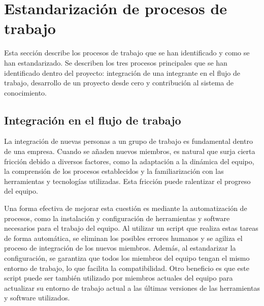 \section{Estandarización de procesos de trabajo}
Esta sección describe los procesos de trabajo que se
han identificado y como se han estandarizado. Se describen
los tres procesos principales que se han identificado dentro
del proyecto: integración de una integrante en el flujo de trabajo,
desarrollo de un proyecto desde cero y contribución al sistema
de conocimiento.

\subsection{Integración en el flujo de trabajo}
La integración de nuevas personas a un grupo de trabajo es fundamental
dentro de una empresa. Cuando se añaden nuevos miembros, es natural que 
surja cierta fricción debido a diversos factores, como la adaptación a 
la dinámica del equipo, la comprensión de los procesos establecidos y la 
familiarización con las herramientas y tecnologías utilizadas. Esta fricción 
puede ralentizar el progreso del equipo.\medskip

Una forma efectiva de mejorar esta cuestión es mediante la automatización de 
procesos, como la instalación y configuración de herramientas y software necesarios 
para el trabajo del equipo. Al utilizar un script que realiza estas tareas de 
forma automática, se eliminan los posibles errores humanos y se agiliza el proceso 
de integración de los nuevos miembros. Además, al estandarizar la configuración, 
se garantiza que todos los miembros del equipo tengan el mismo entorno de trabajo, 
lo que facilita la compatibilidad. Otro beneficio es que este script puede ser
también utilizado por miembros actuales del equipo para actualizar su entorno de
trabajo actual a las últimas versiones de las herramientas y software utilizados.

